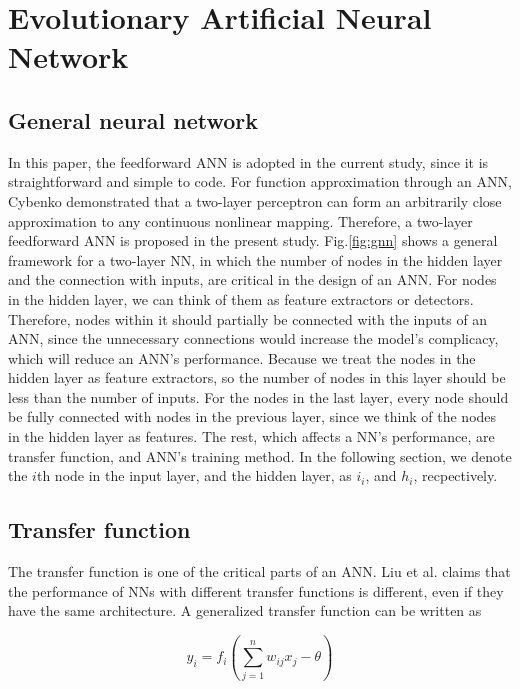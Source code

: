 \section{Evolutionary Artificial Neural Network}

\subsection{General neural network}
In this paper, the feedforward ANN is adopted in the current
study, since it is straightforward and simple to code. For function
approximation through an ANN, Cybenko demonstrated that a two-layer perceptron
can form an arbitrarily close approximation to any continuous nonlinear
mapping\cite{cybenko1989approximation}. Therefore, a two-layer feedforward ANN
is proposed in the present study. Fig.\ref{fig:gnn} shows a general framework for a
two-layer NN, in which the number of nodes in the hidden layer and the
connection with inputs, are critical in the design of an ANN. For nodes in the
hidden layer, we can think of them as feature extractors or detectors.
Therefore, nodes within it should partially be connected with the inputs of an ANN,
since the unnecessary connections would increase the model's complicacy, which
will reduce an ANN’s performance. Because we treat the nodes in the hidden layer
as feature extractors, so the number of nodes in this layer should be less than
the number of inputs. For the nodes in the last layer, every node should be
fully connected with nodes in the previous layer, since we think of the nodes
in the hidden layer as features. The rest, which affects a NN’s performance,
are transfer function, and ANN's training method. In the following section, we
denote the $i$th node in the input layer, and the hidden layer, as $i_i$, and $h_i$,
recpectively.


\subsection{Transfer function}

The transfer function is one of the critical parts of an ANN. Liu
\cite{liu1996evolutionary} et al. claims that the performance of NNs with
different transfer functions is different, even if they have the same
architecture.  A generalized transfer function can be written as

\begin{equation}
	y_i = f_i(\sum_{j=1}^n{w_{ij}x_j - \theta})
\end{equation}


